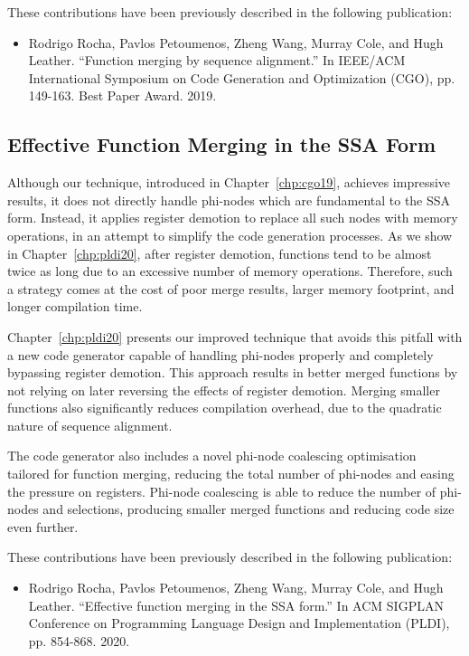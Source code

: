 These contributions have been previously described in the following publication:
\begin{itemize}
\item Rodrigo Rocha, Pavlos Petoumenos, Zheng Wang, Murray Cole, and Hugh Leather. ``Function merging by sequence alignment.'' In IEEE/ACM International Symposium on Code Generation and Optimization (CGO), pp. 149-163. Best Paper Award. 2019.
\end{itemize}

\subsection{Effective Function Merging in the SSA Form}


Although our technique, introduced in Chapter~\ref{chp:cgo19}, achieves impressive results, it does not directly handle phi-nodes which are fundamental to the SSA form.
Instead, it applies register demotion to replace all such nodes with memory operations, in an attempt to simplify the code generation processes.
As we show in Chapter~\ref{chp:pldi20}, after register demotion, functions tend to be almost twice as long due to an excessive number of memory operations.
Therefore, such a strategy comes at the cost of poor merge results, larger memory footprint, and longer compilation time.

Chapter~\ref{chp:pldi20} presents our improved technique that avoids this pitfall with a new code generator capable of handling phi-nodes properly and completely bypassing register demotion.
This approach results in better merged functions by not relying on later reversing the effects of register demotion.
Merging smaller functions also significantly reduces compilation overhead, due to the quadratic nature of sequence alignment.

The code generator also includes a novel phi-node coalescing optimisation tailored for function merging, reducing the total number of phi-nodes and easing the pressure on registers.
Phi-node coalescing is able to reduce the number of phi-nodes and selections, producing smaller merged functions and reducing code size even further.

These contributions have been previously described in the following publication:
\begin{itemize}
\item Rodrigo Rocha, Pavlos Petoumenos, Zheng Wang, Murray Cole, and Hugh Leather. ``Effective function merging in the SSA form.'' In ACM SIGPLAN Conference on Programming Language Design and Implementation (PLDI), pp. 854-868. 2020.
\end{itemize}

